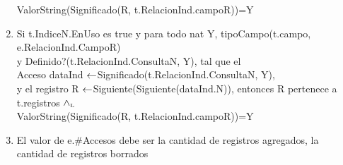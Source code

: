 \begin{enumerate}
 ValorString(Significado(R, t.RelacionInd.campoR))=Y
\item Si t.IndiceN.EnUso es true y para todo nat Y, tipoCampo(t.campo, e.RelacionInd.CampoR) \\y Definido?(t.RelacionInd.ConsultaN, Y), tal que el\\
 Acceso dataInd $\leftarrow$Significado(t.RelacionInd.ConsultaN, Y), \\
 y el registro R $\leftarrow$Siguiente(Siguiente(dataInd.N)), entonces R pertenece a t.registros $\land_{\mathrm{\scriptscriptstyle{L}}}$ \\
 ValorString(Significado(R, t.RelacionInd.campoR))=Y

\item El valor de e.\#Accesos debe ser la cantidad de registros agregados, la cantidad de registros borrados
\end{enumerate}



